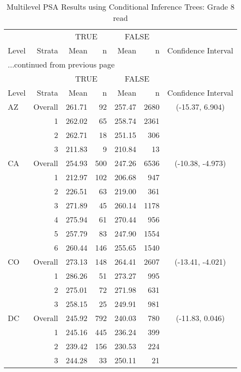 \begin{longtable}{lrrr@{\extracolsep{.25cm}}rrc}
\caption{Multilevel PSA Results using Conditional Inference Trees: Grade 8 read} \\ 
   \hline & & \multicolumn{2}{c}{TRUE} & \multicolumn{2}{c}{FALSE} & \\ \cline{3-4} \cline{5-6} Level & Strata & Mean & n & Mean & n & Confidence Interval \\ \hline\endfirsthead \multicolumn{7}{l}{{...continued from previous page}}\\ \hline  & & \multicolumn{2}{c}{TRUE} & \multicolumn{2}{c}{FALSE} & \\ \cline{3-4} \cline{5-6} Level & Strata & Mean & n & Mean & n & Confidence Interval \\ \hline \endhead \endfoot \endlastfoot  \hline
AZ & Overall & 261.71 &  92 & 257.47 & 2680 & (-15.37,   6.904) \\ 
   & 1 & 262.02 &  65 & 258.74 & 2361 &  \\ 
   & 2 & 262.71 &  18 & 251.15 & 306 &  \\ 
   & 3 & 211.83 &   9 & 210.84 &  13 &  \\ 
   \hline
CA & Overall & 254.93 & 500 & 247.26 & 6536 & (-10.38,  -4.973) \\ 
   & 1 & 212.97 & 102 & 206.68 & 947 &  \\ 
   & 2 & 226.51 &  63 & 219.00 & 361 &  \\ 
   & 3 & 271.89 &  45 & 260.14 & 1178 &  \\ 
   & 4 & 275.94 &  61 & 270.44 & 956 &  \\ 
   & 5 & 257.79 &  83 & 247.90 & 1554 &  \\ 
   & 6 & 260.44 & 146 & 255.65 & 1540 &  \\ 
   \hline
CO & Overall & 273.13 & 148 & 264.41 & 2607 & (-13.41,  -4.021) \\ 
   & 1 & 286.26 &  51 & 273.27 & 995 &  \\ 
   & 2 & 275.01 &  72 & 271.98 & 631 &  \\ 
   & 3 & 258.15 &  25 & 249.91 & 981 &  \\ 
   \hline
DC & Overall & 245.92 & 792 & 240.03 & 780 & (-11.83,   0.046) \\ 
   & 1 & 245.16 & 445 & 236.24 & 399 &  \\ 
   & 2 & 239.42 & 156 & 230.53 & 224 &  \\ 
   & 3 & 244.28 &  33 & 250.11 &  21 &  \\ 

\end{longtable}
